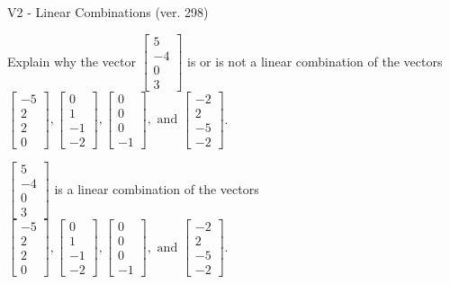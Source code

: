 \begin{exercise}
  \begin{exerciseTitle}V2 - Linear Combinations (ver. 298)\end{exerciseTitle}
  \begin{exerciseStatement}
    Explain why the vector \(\left[\begin{array}{c}
5 \\
-4 \\
0 \\
3
\end{array}\right]\)  is or is not a linear 
	combination of the vectors \(\left[\begin{array}{c}
-5 \\
2 \\
2 \\
0
\end{array}\right] , \left[\begin{array}{c}
0 \\
1 \\
-1 \\
-2
\end{array}\right] , \left[\begin{array}{c}
0 \\
0 \\
0 \\
-1
\end{array}\right] , \text{ and } \left[\begin{array}{c}
-2 \\
2 \\
-5 \\
-2
\end{array}\right]\).
	


  \end{exerciseStatement}
  \begin{exerciseAnswer}
   \(\left[\begin{array}{c}
5 \\
-4 \\
0 \\
3
\end{array}\right]\) 
  	 is  
	a linear combination of the vectors \(\left[\begin{array}{c}
-5 \\
2 \\
2 \\
0
\end{array}\right] , \left[\begin{array}{c}
0 \\
1 \\
-1 \\
-2
\end{array}\right] , \left[\begin{array}{c}
0 \\
0 \\
0 \\
-1
\end{array}\right] , \text{ and } \left[\begin{array}{c}
-2 \\
2 \\
-5 \\
-2
\end{array}\right]\).


\end{exerciseAnswer}
\end{exercise}
